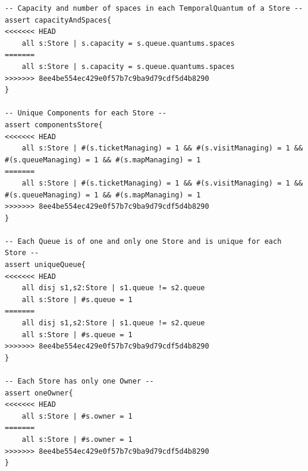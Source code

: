 \documentclass[a4paper, 12pt, oneside]{article}
\begin{document}
\begin{enumerate}[labelindent=20pt, label={UC.\arabic*}, itemindent=1em,leftmargin=!]
\begin{lstlisting}[language=alloy]
-- Capacity and number of spaces in each TemporalQuantum of a Store --
assert capacityAndSpaces{
<<<<<<< HEAD
    all s:Store | s.capacity = s.queue.quantums.spaces
=======
	all s:Store | s.capacity = s.queue.quantums.spaces
>>>>>>> 8ee4be554ec429e0f57b7c9ba9d79cdf5d4b8290
}

-- Unique Components for each Store --
assert componentsStore{
<<<<<<< HEAD
    all s:Store | #(s.ticketManaging) = 1 && #(s.visitManaging) = 1 && #(s.queueManaging) = 1 && #(s.mapManaging) = 1
=======
	all s:Store | #(s.ticketManaging) = 1 && #(s.visitManaging) = 1 && #(s.queueManaging) = 1 && #(s.mapManaging) = 1
>>>>>>> 8ee4be554ec429e0f57b7c9ba9d79cdf5d4b8290
}

-- Each Queue is of one and only one Store and is unique for each Store --
assert uniqueQueue{
<<<<<<< HEAD
    all disj s1,s2:Store | s1.queue != s2.queue
    all s:Store | #s.queue = 1  
=======
	all disj s1,s2:Store | s1.queue != s2.queue
	all s:Store | #s.queue = 1	
>>>>>>> 8ee4be554ec429e0f57b7c9ba9d79cdf5d4b8290
}

-- Each Store has only one Owner --
assert oneOwner{
<<<<<<< HEAD
    all s:Store | #s.owner = 1
=======
	all s:Store | #s.owner = 1
>>>>>>> 8ee4be554ec429e0f57b7c9ba9d79cdf5d4b8290
}
\end{lstlisting}


\end{enumerate}
\end{document}
